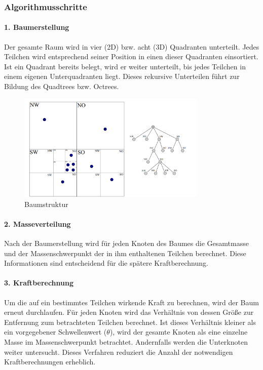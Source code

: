 \documentclass[a4paper,12pt,twoside]{article}
\begin{document}
\subsubsection{Algorithmusschritte}

\paragraph{1. Baumerstellung}
Der gesamte Raum wird in vier (2D) bzw. acht (3D) Quadranten unterteilt. Jedes Teilchen wird entsprechend seiner Position in einen dieser Quadranten einsortiert. Ist ein Quadrant bereits belegt, wird er weiter unterteilt, bis jedes Teilchen in einem eigenen Unterquadranten liegt. Dieses rekursive Unterteilen führt zur Bildung des Quadtrees bzw. Octrees.

\begin{figure}[H]
	\centering
	\includegraphics[width=0.8\textwidth]{Baumstruktur.png}
	\caption[Eintrag in Abbildungsverzeichnis von Grumpy Cat]{Baumstruktur}
	\label{Baumstruktur .}
\end{figure}



\paragraph{2. Masseverteilung}
Nach der Baumerstellung wird für jeden Knoten des Baumes die Gesamtmasse und der Massenschwerpunkt der in ihm enthaltenen Teilchen berechnet. Diese Informationen sind entscheidend für die spätere Kraftberechnung.

\paragraph{3. Kraftberechnung}
Um die auf ein bestimmtes Teilchen wirkende Kraft zu berechnen, wird der Baum erneut durchlaufen. Für jeden Knoten wird das Verhältnis von dessen Größe zur Entfernung zum betrachteten Teilchen berechnet. Ist dieses Verhältnis kleiner als ein vorgegebener Schwellenwert ($\theta$), wird der gesamte Knoten als eine einzelne Masse im Massenschwerpunkt betrachtet. Andernfalls werden die Unterknoten weiter untersucht. Dieses Verfahren reduziert die Anzahl der notwendigen Kraftberechnungen erheblich.
\end{document}

